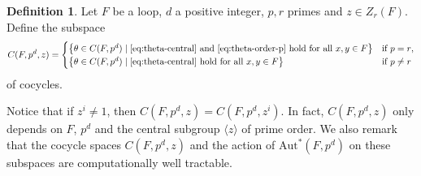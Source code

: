 \documentclass[12pt,a4paper]{amsart}
\theoremstyle{definition}
\newtheorem{definition}[theorem]{Definition}
\begin{document}
\begin{definition}\label{def:nonexact-cocycle}
Let $F$ be a loop, $d$ a positive integer, $p,r$ primes and $z\in Z_r(F)$. Define the subspace
\begin{align*}
C(F,p^{d},z) =
\begin{cases}
\bigl\{\theta\in C(F,p^{d})\mid \text{\eqref{eq:theta-central} and \eqref{eq:theta-order-p} hold for all $x,y\in F$} \bigr\} & \text{if $p=r$}, \\
\bigl\{\theta\in C(F,p^{d})\mid \text{\eqref{eq:theta-central} hold for all $x,y\in F$} \bigr\} & \text{if $p\neq r$}
\end{cases}
\end{align*}
of cocycles. 
\end{definition}

Notice that if $z^i\neq 1$, then $C(F,p^{d},z)=C(F,p^{d},z^i)$. In fact, $C(F,p^{d},z)$ only depends on $F$, $p^d$ and the central subgroup $\langle z \rangle$ of prime order. We also remark that the cocycle spaces $C(F,p^d,z)$ and the action of $\mathrm{Aut}^{\!*}(F,p^{d})$ on these subspaces are computationally well tractable.
\end{document}
